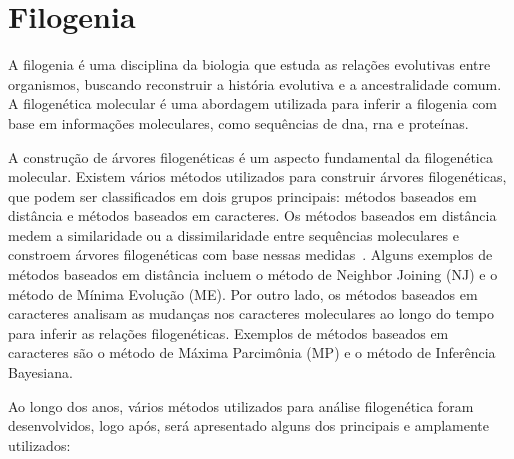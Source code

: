 \section{Filogenia}

A filogenia é uma disciplina da biologia que estuda as relações evolutivas entre organismos, buscando reconstruir a história evolutiva e a ancestralidade comum. A filogenética molecular é uma abordagem utilizada para inferir a filogenia com base em informações moleculares, como sequências de \gls{dna}, \gls{rna} e proteínas\cite{felsenstein_inferring_2004}.

A construção de árvores filogenéticas é um aspecto fundamental da filogenética molecular. Existem vários métodos utilizados para construir árvores filogenéticas, que podem ser classificados em dois grupos principais: métodos baseados em distância e métodos baseados em caracteres.
Os métodos baseados em distância medem a similaridade ou a dissimilaridade entre sequências moleculares e constroem árvores filogenéticas com base nessas medidas~\cite{saitou_neighbor_1987,felsenstein_inferring_2004}. Alguns exemplos de métodos baseados em distância incluem o método de Neighbor Joining (NJ) e o método de Mínima Evolução (ME).
Por outro lado, os métodos baseados em caracteres analisam as mudanças nos caracteres moleculares ao longo do tempo para inferir as relações filogenéticas. Exemplos de métodos baseados em caracteres são o método de Máxima Parcimônia (MP) e o método de Inferência Bayesiana\cite{swofford_phylogenetic_1996}.

Ao longo dos anos, vários métodos utilizados para análise filogenética foram desenvolvidos, logo após, será apresentado alguns dos principais e amplamente utilizados:

